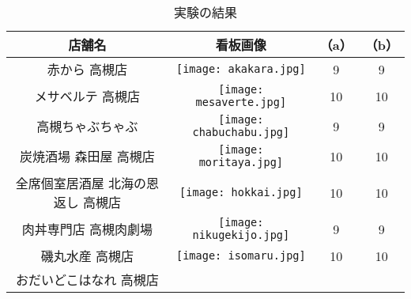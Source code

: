   \begin{table}[t]
    \caption{実験の結果}
    \label{table:recog_result}
    \begin{center}
      \begin{tabular}{cc|cc}
        \hline\hline
        店舗名 & 看板画像 & （a） & （b） \\ \hline
        赤から 高槻店 & 
        \begin{minipage}{40mm}
          \centering
          \texttt{[image: akakara.jpg]}
        \end{minipage} & 9 & 9 \\
        メサベルテ 高槻店 & 
        \begin{minipage}{40mm}
          \centering
          \texttt{[image: mesaverte.jpg]}
        \end{minipage} & 10 & 10 \\
        高槻ちゃぶちゃぶ & 
        \begin{minipage}{40mm}
          \centering
          \texttt{[image: chabuchabu.jpg]}
        \end{minipage} & 9 & 9 \\
        炭焼酒場 森田屋 高槻店 & 
        \begin{minipage}{40mm}
          \centering
          \texttt{[image: moritaya.jpg]}
        \end{minipage} & 10 & 10 \\
        全席個室居酒屋 北海の恩返し 高槻店 & 
        \begin{minipage}{40mm}
          \centering
          \texttt{[image: hokkai.jpg]}
        \end{minipage} & 10 & 10 \\
        肉丼専門店 高槻肉劇場 & 
        \begin{minipage}{40mm}
          \centering
          \texttt{[image: nikugekijo.jpg]}
        \end{minipage} & 9 & 9 \\
        磯丸水産 高槻店 & 
        \begin{minipage}{40mm}
          \centering
          \texttt{[image: isomaru.jpg]}
        \end{minipage} & 10 & 10 \\
        おだいどこはなれ 高槻店 & 
        \begin{minipage}{40mm}
          \centering

\end{minipage}
\end{tabular}
\end{center}
\end{table}
